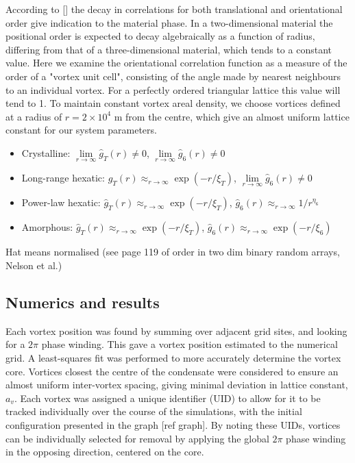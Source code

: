 According to [] the decay in correlations for both translational and orientational order give indication to the material phase. In a
two-dimensional material the positional order is expected to decay algebraically as a function of radius, differing from that of a
three-dimensional material, which tends to a constant value. Here we examine the orientational correlation function as a measure of the
order of a "vortex unit cell", consisting of the angle made by nearest neighbours to an individual vortex. For a perfectly ordered
triangular lattice this value will tend to 1. To maintain constant vortex areal density, we choose vortices defined at a radius of
$r=2\times 10^4$ m from the centre, which give an almost uniform lattice constant for our system parameters.

\begin{itemize}
\item Crystalline: $\lim\limits_{r\rightarrow \infty}\hat{g}_T(r) \neq 0$, $\lim\limits_{r\rightarrow \infty}\hat{g}_6(r) \neq 0$
\item Long-range hexatic: $\hat{g}_T(r) \approx _{r\rightarrow \infty} \exp(-r/\xi_T) $, $\lim\limits_{r\rightarrow \infty}\hat{g}_6(r) \neq 0$
\item Power-law hexatic: $\hat{g}_T(r) \approx _{r\rightarrow \infty} \exp(-r/\xi_T) $, $\hat{g}_6(r) \approx _{r\rightarrow \infty} 1/r^{\eta_6}$
\item Amorphous: $\hat{g}_T(r) \approx _{r\rightarrow \infty} \exp(-r/\xi_T) $, $\hat{g}_6(r) \approx _{r\rightarrow \infty} \exp(-r/\xi_6) $
\end{itemize}
Hat means normalised (see page 119 of order in two dim binary random arrays, Nelson et al.)


\subsection{Numerics and results}\label{sec:numerics}

Each vortex position was found by summing over adjacent grid sites, and looking for a $2\pi$ phase winding. This gave a vortex position
estimated to the numerical grid. A least-squares fit was performed to more accurately determine the vortex core. Vortices closest the centre
of the condensate were considered to ensure an almost uniform inter-vortex spacing, giving minimal deviation in lattice constant, $a_v$. Each
vortex was assigned a unique identifier (UID) to allow for it to be tracked individually over the course of the simulations, with the initial
configuration presented in the graph [ref graph]. By noting these UIDs, vortices can be individually selected for removal by applying the
global $2\pi$ phase winding in the opposing direction, centered on the core.

